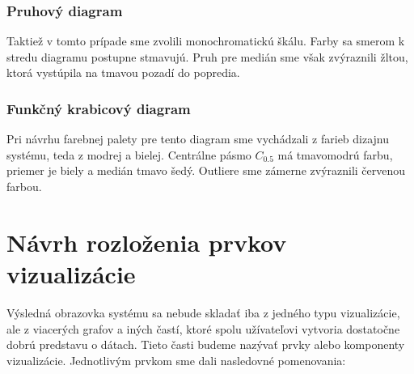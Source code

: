 \subsubsection{Pruhový diagram} 
Taktiež v tomto prípade sme zvolili monochromatickú škálu. Farby sa smerom k stredu diagramu postupne stmavujú. Pruh pre medián sme však zvýraznili žltou, ktorá vystúpila na tmavou pozadí do popredia.

\subsubsection{Funkčný krabicový diagram} 
Pri návrhu farebnej palety pre tento diagram sme vychádzali z farieb dizajnu systému, teda z modrej a bielej. Centrálne pásmo $ C_{0.5} $ má tmavomodrú farbu, priemer je biely a medián tmavo šedý. Outliere sme zámerne zvýraznili červenou farbou.

\section{Návrh rozloženia prvkov vizualizácie}
Výsledná obrazovka systému sa nebude skladať iba z jedného typu vizualizácie, ale z viacerých grafov a iných častí, ktoré spolu užívateľovi vytvoria dostatočne dobrú predstavu o dátach. Tieto časti budeme nazývať prvky alebo komponenty vizualizácie. Jednotlivým prvkom sme dali nasledovné pomenovania: 

